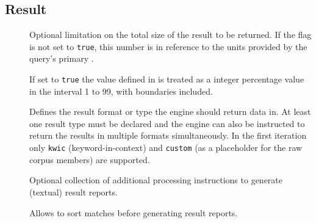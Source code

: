 \documentclass[11pt,a4paper]{article}
\begin{document}
\subsection{Result}
\label{sec:json-ld-result}
\begin{attributes}{}
\end{attributes}
\begin{description}
	\item[] Optional limitation on the total size of the result to be returned. If the  flag is not set to \texttt{true}, this number is in reference to the units provided by the query's primary .
	\item[] If set to \texttt{true} the value defined in  is treated as a integer percentage value in the interval 1 to 99, with boundaries included.
\end{description}
\begin{elements}{}
\end{elements}
\begin{description}
	\item[] Defines the result format or type the engine should return data in. At least one result type must be declared and the engine can also be instructed to return the results in multiple formats simultaneously. In the first iteration only \texttt{kwic} (keyword-in-context) and \texttt{custom} (as a placeholder for the raw corpus members) are supported.
	\item[] Optional collection of additional processing instructions to generate (textual) result reports.
	\item[] Allows to sort matches before generating result reports.
\end{description}
\end{document}
